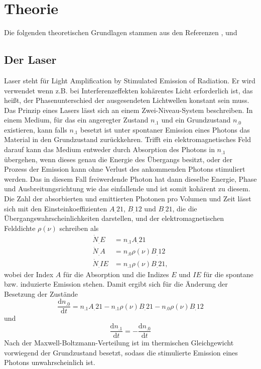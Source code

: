 \section{Theorie}
\label{sec:Theorie}

Die folgenden theoretischen Grundlagen stammen aus den Referenzen \cite{lasertheorie1}, \cite{lasertheorie2} und  \cite{lasertheorie3}

\subsection{Der Laser}
Laser steht für Light Amplification by Stimulated Emission of Radiation. Er wird verwendet wenn z.B. bei Interferenzeffekten kohärentes Licht erforderlich ist, das heißt, der Phasenunterschied der ausgesendeten Lichtwellen konstant sein muss.\\
Das Prinzip eines Lasers lässt sich an einem Zwei-Niveau-System beschreiben.
In einem Medium, für das ein angeregter Zustand $n_.1$ und ein Grundzustand $n_.0$ existieren, kann falls $n_.1$ besetzt ist unter spontaner Emission eines Photons das Material in den Grundzustand zurückkehren.
Trifft ein elektromagnetisches Feld darauf kann das Medium entweder durch Absorption des Photons in $n_.1$ übergehen, wenn dieses genau die Energie des Übergangs besitzt, oder der Prozess der Emission kann ohne Verlust des ankommenden Photons stimuliert werden. Das in diesem Fall freiwerdende Photon hat dann dieselbe Energie, Phase und Ausbreitungsrichtung wie das einfallende und ist somit kohärent zu diesem.
Die Zahl der absorbierten und emittierten Photonen pro Volumen und Zeit lässt sich mit den Einsteinkoeffizienten $A_.{21}$, $B_.{12}$ und $B_.{21}$, die die Übergangswahrscheinlichkeiten darstellen, und der elektromagnetischen Felddichte $\rho(\nu)$ schreiben als
\begin{align*}
\dot{N}_.E&=n_.1  A_.{21}\\
\dot{N}_.A&=n_.0 \rho(\nu) B_.{12}\\
\dot{N}_.{IE}&=n_.1 \rho(\nu) B_.{21},
\end{align*}
wobei der Index $A$ für die Absorption und die Indizes $E$ und $IE$ für die spontane bzw. induzierte Emission stehen.
Damit ergibt sich für die Änderung der Besetzung der Zustände
\[
\frac{\mathrm{d}n_.0}{\mathrm{d}t}=n_.1A_.{21}-n_.1 \rho(\nu) B_.{21}-n_.0 \rho(\nu) B_.{12}
\]
und 
\[
\frac{\mathrm{d}n_.1}{\mathrm{d}t}=-\frac{\mathrm{d}n_.0}{\mathrm{d}t}
\]
Nach der Maxwell-Boltzmann-Verteilung ist im thermischen Gleichgewicht vorwiegend der Grundzustand besetzt, sodass die stimulierte Emission eines Photons unwahrscheinlich ist.
